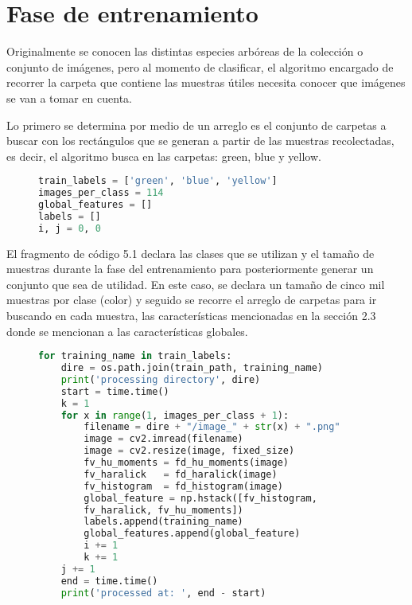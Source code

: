 \section{Fase de entrenamiento}
Originalmente se conocen las distintas especies arbóreas de la colección o conjunto de imágenes, pero al momento de clasificar, el algoritmo encargado de recorrer la carpeta que contiene las muestras útiles  necesita conocer que imágenes se van a tomar en cuenta. 

Lo primero se determina por medio de un arreglo es el conjunto de carpetas a buscar con los rectángulos que se generan a partir de las muestras recolectadas, es decir, el algoritmo busca en las carpetas: green, blue y yellow. 

\begin{figure}[H]
\centering
\begin{lstlisting}[basicstyle=\small, language=Python, caption=Declaración de variables]
train_labels = ['green', 'blue', 'yellow']
images_per_class = 114 
global_features = []
labels = []
i, j = 0, 0
\end{lstlisting}
\label{Declaracion-variables}
\end{figure}

El fragmento de código 5.1 declara las clases que se utilizan y el tamaño de muestras durante la fase del entrenamiento para posteriormente generar un conjunto que sea de utilidad. En este caso, se declara un tamaño de cinco mil muestras por clase (color) y seguido se recorre el arreglo de carpetas para ir buscando en cada muestra, las características mencionadas en la sección 2.3 donde se mencionan a las características globales.

\begin{figure}[H]
\centering
\begin{lstlisting}[basicstyle=\small, language=Python, caption=Código para entrenar modelo]
for training_name in train_labels:
    dire = os.path.join(train_path, training_name)
    print('processing directory', dire)
    start = time.time()
    k = 1
    for x in range(1, images_per_class + 1):
        filename = dire + "/image_" + str(x) + ".png"
        image = cv2.imread(filename)
        image = cv2.resize(image, fixed_size)
        fv_hu_moments = fd_hu_moments(image)
        fv_haralick   = fd_haralick(image)
        fv_histogram  = fd_histogram(image)
        global_feature = np.hstack([fv_histogram, 
        fv_haralick, fv_hu_moments])
        labels.append(training_name)
        global_features.append(global_feature)
        i += 1
        k += 1
    j += 1
    end = time.time()
    print('processed at: ', end - start)
\end{lstlisting}
\label{Recorriendo-folders}
\end{figure}

